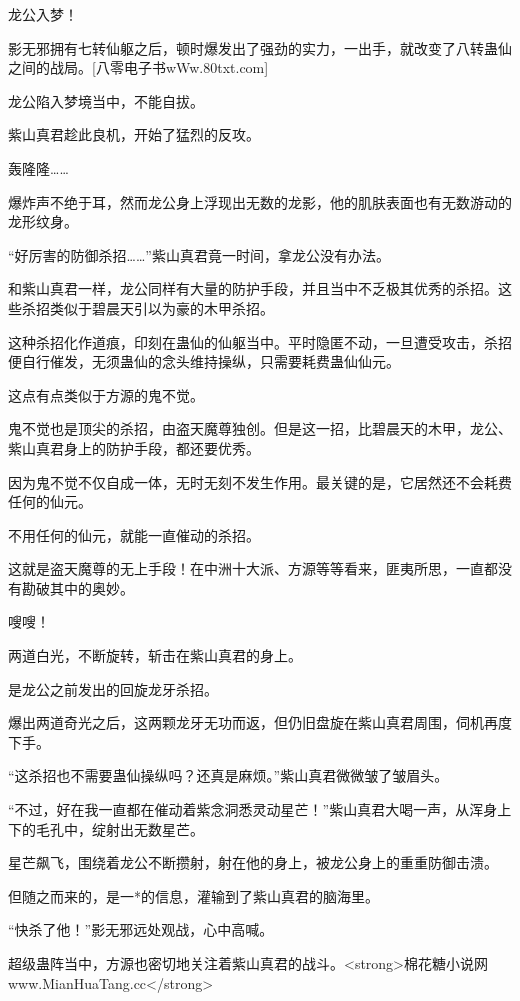 
\begin{this_body}

龙公入梦！

影无邪拥有七转仙躯之后，顿时爆发出了强劲的实力，一出手，就改变了八转蛊仙之间的战局。[八零电子书wWw.80txt.com]

龙公陷入梦境当中，不能自拔。

紫山真君趁此良机，开始了猛烈的反攻。

轰隆隆……

爆炸声不绝于耳，然而龙公身上浮现出无数的龙影，他的肌肤表面也有无数游动的龙形纹身。

“好厉害的防御杀招……”紫山真君竟一时间，拿龙公没有办法。

和紫山真君一样，龙公同样有大量的防护手段，并且当中不乏极其优秀的杀招。这些杀招类似于碧晨天引以为豪的木甲杀招。

这种杀招化作道痕，印刻在蛊仙的仙躯当中。平时隐匿不动，一旦遭受攻击，杀招便自行催发，无须蛊仙的念头维持操纵，只需要耗费蛊仙仙元。

这点有点类似于方源的鬼不觉。

鬼不觉也是顶尖的杀招，由盗天魔尊独创。但是这一招，比碧晨天的木甲，龙公、紫山真君身上的防护手段，都还要优秀。

因为鬼不觉不仅自成一体，无时无刻不发生作用。最关键的是，它居然还不会耗费任何的仙元。

不用任何的仙元，就能一直催动的杀招。

这就是盗天魔尊的无上手段！在中洲十大派、方源等等看来，匪夷所思，一直都没有勘破其中的奥妙。

嗖嗖！

两道白光，不断旋转，斩击在紫山真君的身上。

是龙公之前发出的回旋龙牙杀招。

爆出两道奇光之后，这两颗龙牙无功而返，但仍旧盘旋在紫山真君周围，伺机再度下手。

“这杀招也不需要蛊仙操纵吗？还真是麻烦。”紫山真君微微皱了皱眉头。

“不过，好在我一直都在催动着紫念洞悉灵动星芒！”紫山真君大喝一声，从浑身上下的毛孔中，绽射出无数星芒。

星芒飙飞，围绕着龙公不断攒射，射在他的身上，被龙公身上的重重防御击溃。

但随之而来的，是一*的信息，灌输到了紫山真君的脑海里。

“快杀了他！”影无邪远处观战，心中高喊。

超级蛊阵当中，方源也密切地关注着紫山真君的战斗。<strong>棉花糖小说网www.MianHuaTang.cc</strong>


\end{this_body}
